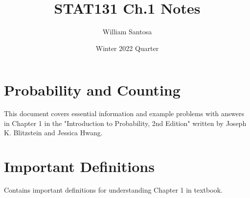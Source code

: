 \documentclass[12pt, letterpaper]{article}
\title{STAT131 Ch.1 Notes}
\author{William Santosa}
\date{Winter 2022 Quarter}
\begin{document}
\maketitle

\section{Probability and Counting}
This document covers essential information and example problems with answers in Chapter 1 in the "Introduction to Probability, 2nd Edition" written by Joseph K. Blitzstein and Jessica Hwang.

\section{Important Definitions}

Contains important definitions for understanding Chapter 1 in textbook.
\end{document}
